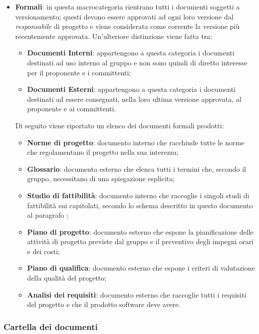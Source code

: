 \begin{itemize}
    \item \textbf{Formali}: in questa macrocategoria rientrano tutti i documenti soggetti a versionamento; questi devono 
    essere approvati ad ogni loro versione dal \emph{responsabile} di progetto e viene considerata come corrente la 
    versione più recentemente approvata. Un'ulteriore distinzione viene fatta tra:
    \begin{itemize}
        \item \textbf{Documenti Interni}: appartengono a questa categoria i documenti destinati ad uso interno al 
        gruppo e non sono quindi di diretto interesse per il proponente e i committenti;
        \item \textbf{Documenti Esterni}: appartengono a questa categoria i documenti destinati ad essere consegnati, 
        nella loro ultima versione approvata, al proponente e ai committenti.
    \end{itemize}
    Di seguito viene riportato un elenco dei documenti formali prodotti:
    \begin{itemize}
        \item \textbf{Norme di progetto}: documento interno che racchiude tutte le norme che regolamentano il progetto 
        nella sua interezza;
        \item \textbf{Glossario}: documento esterno che elenca tutti i termini che, secondo il gruppo, necessitano di 
        una spiegazione esplicita;
        \item \textbf{Studio di fattibilità}: documento interno che raccoglie i singoli studi di fattibilità sui 
        capitolati, secondo lo schema descritto in questo documento al paragrafo ;
        \item \textbf{Piano di progetto}: documento esterno che espone la pianificazione delle attività di progetto 
        previste dal gruppo e il preventivo degli impegni orari e dei costi;
        \item \textbf{Piano di qualifica}: documento esterno che espone i criteri di valutazione della qualità del 
        progetto;
        \item \textbf{Analisi dei requisiti}: documento esterno che raccoglie tutti i requisiti del progetto e che il 
        prodotto software deve avere.
  \end{itemize}
  
\end{itemize}

\subsubsection{Cartella dei documenti}
\label{ssub:cartella_doc}


